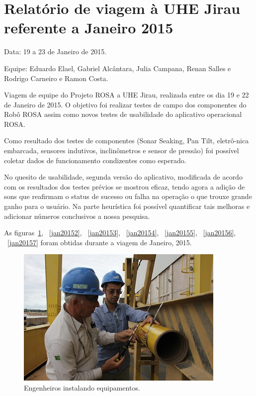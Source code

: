 \section{Relatório de viagem à UHE Jirau
referente a Janeiro 2015}
Data: 19 a 23 de Janeiro de 2015.

Equipe: Eduardo Elael, Gabriel Alcântara, Julia Campana, Renan Salles e Rodrigo Carneiro e Ramon Costa.

Viagem de equipe do Projeto ROSA a UHE Jirau, realizada entre
os dia 19 e 22 de Janeiro de 2015. O objetivo foi realizar testes de campo dos
componentes do Robô ROSA assim como novos testes de usabilidade do aplicativo
operacional ROSA.

Como resultado dos testes de componentes (Sonar Seaking, Pan Tilt, eletrô-\-nica
embarcada, sensores indutivos, inclinômetros e sensor de pressão) foi possível
coletar dados de funcionamento condizentes como esperado.

No quesito de usabilidade, segunda versão do aplicativo, modificada de acordo
com os resultados dos testes prévios se mostrou eficaz, tendo agora a adição de
sons que reafirmam o status de sucesso ou falha na operação o que trouxe grande
ganho para o usuário. Na parte heurística foi possível quantificar tais
melhoras e adicionar números conclusivos a nossa pesquisa.

As figuras~\ref{jan20151}, ~\ref{jan20152}, ~\ref{jan20153}, ~\ref{jan20154},
~\ref{jan20155}, ~\ref{jan20156}, ~\ref{jan20157} foram obtidas durante a viagem
de Janeiro, 2015.

\begin{figure}[h!]
\centering
  \includegraphics[width=1\linewidth]{Fotos/Janeiro2015/5.JPG}
  \caption{Engenheiros instalando equipamentos.}
  \label{jan20151}
\end{figure}

